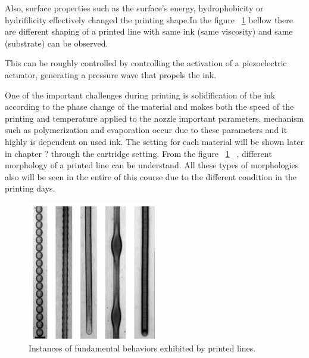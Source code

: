 Also, surface properties such as the surface's energy, hydrophobicity or hydrifilicity effectively changed the printing shape.In the figure ~\ref{fig12} bellow there are different shaping of a printed line with same ink (same viscosity) and same (substrate) can be observed.

This can be roughly controlled by controlling the activation of a piezoelectric actuator, generating a pressure wave that propels the ink. 

One of the important challenges during printing is solidification of the ink according to the phase change of the material and makes both the speed of the printing and temperature applied to the nozzle important parameters. mechanism such as polymerization and evaporation occur due to these parameters and it highly is dependent on used ink. The setting for each material will be shown  later in  chapter ?  through the cartridge setting.
From the figure ~\ref{fig12} ~\cite{ref27}, different morphology of a printed line can be understand. All these types of morphologies also will be seen in the entire of this course due to the different condition in the printing days.
\begin{figure}[h!]
\centering
\includegraphics[width=0.5\textwidth]{figures/fig12.png}
\caption[Example of caption.]{Instances of fundamental behaviors exhibited by printed lines.\label{fig12}}
\end{figure}

~\cite{ref27} 





